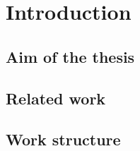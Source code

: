 \section{Introduction}



\subsection{Aim of the thesis}
\subsection{Related work}
\subsection{Work structure}

